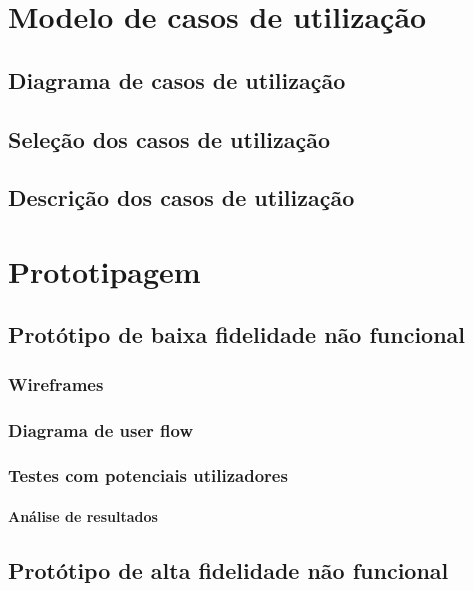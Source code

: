 \documentclass[12pt, twoside]{report}
\begin{document}
	
	\chapter{Modelo de casos de utilização}
	
	
	\section{Diagrama de casos de utilização}
	\label{diagrama}
	


	\section{Seleção dos casos de utilização}

	
	\section{Descrição dos casos de utilização}
	\label{descricaousecase}
	


	
	\chapter{Prototipagem}
	
	\section{Protótipo de baixa fidelidade não funcional}
	
	\subsection{Wireframes}

	
	\subsection{Diagrama de user flow}

	\subsection{Testes com potenciais utilizadores}

	\subsubsection{Análise de resultados}
	\section{Protótipo de alta fidelidade não funcional}
	
\end{document}
